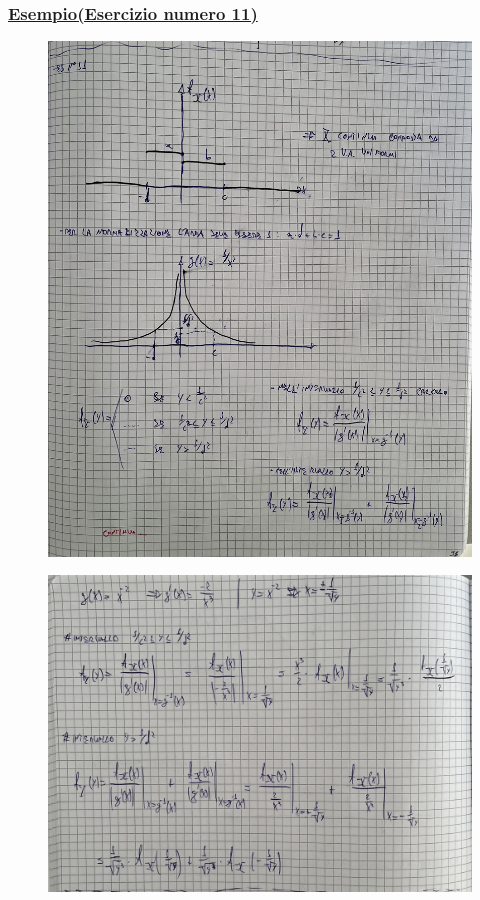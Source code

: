 \documentclass{article}
\begin{document}
\subsubsection{\underline{Esempio(Esercizio numero 11)}}
\begin{figure}[ht]
\centering
\includegraphics[scale=0.10]{ese/28.jpeg}
\end{figure}
\begin{figure}[ht]
\centering
\includegraphics[scale=0.10]{ese/28a.jpeg}
\end{figure}
\end{document}
